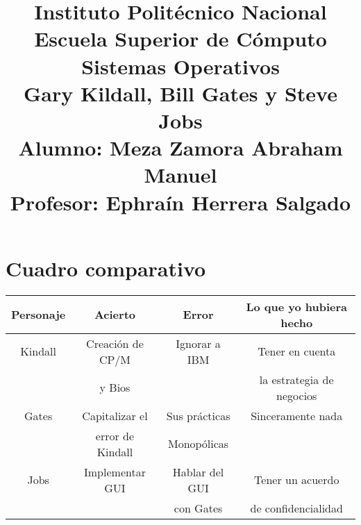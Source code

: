 \documentclass[a4paper,12pt]{article}
\begin{document}
\title{\Large Instituto Politécnico Nacional\\Escuela Superior de Cómputo\\Sistemas Operativos\\ Gary Kildall, Bill Gates y Steve Jobs  \\Alumno: Meza Zamora Abraham Manuel\\Profesor: Ephra\'in Herrera Salgado}
\date{}
\maketitle

\section{Cuadro comparativo} 

\begin{center}
\begin{tabular}{ |c|c|c|c| } 
 \hline
\textbf{Personaje }& \textbf{Acierto} & \textbf{Error} &\textbf{Lo que yo hubiera hecho} \\ 
 \hline
Kindall & Creación de CP/M  & Ignorar a IBM & Tener en cuenta  \\
& y Bios &  & la estrategia de negocios \\ 
 \hline
Gates & Capitalizar el & Sus prácticas  & Sinceramente nada \\
 & error de Kindall & Monopólicas &  \\
 \hline
Jobs & Implementar GUI & Hablar del GUI  & Tener un acuerdo \\
& &con Gates & de confidencialidad \\
 \hline
\end{tabular}
\end{center}
\end{document}
